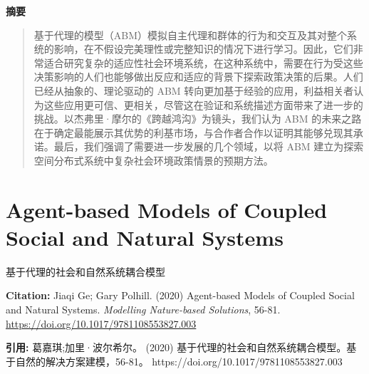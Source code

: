 \noindent\textbf{摘要}\par
\begin{quote}\small
基于代理的模型（ABM）模拟自主代理和群体的行为和交互及其对整个系统的影响，在不假设完美理性或完整知识的情况下进行学习。因此，它们非常适合研究复杂的适应性社会环境系统，在这种系统中，需要在行为受这些决策影响的人们也能够做出反应和适应的背景下探索政策决策的后果。人们已经从抽象的、理论驱动的 ABM 转向更加基于经验的应用，利益相关者认为这些应用更可信、更相关，尽管这在验证和系统描述方面带来了进一步的挑战。以杰弗里·摩尔的《跨越鸿沟》为镜头，我们认为 ABM 的未来之路在于确定最能展示其优势的利基市场，与合作者合作以证明其能够兑现其承诺。最后，我们强调了需要进一步发展的几个领域，以将 ABM 建立为探索空间分布式系统中复杂社会环境政策情景的预期方法。
\end{quote}

\vspace{0.5em}


\chapter{Agent-based Models of Coupled Social and Natural Systems}
\begin{center}\small 基于代理的社会和自然系统耦合模型\end{center}

\noindent\textbf{Citation:} Jiaqi Ge; Gary Polhill. (2020) Agent-based Models of Coupled Social and Natural Systems. \textit{Modelling Nature-based Solutions}, 56-81. \url{https://doi.org/10.1017/9781108553827.003}

\vspace{0.5em}
\noindent\textbf{引用:} 葛嘉琪;加里·波尔希尔。 (2020) 基于代理的社会和自然系统耦合模型。基于自然的解决方案建模，56-81。 https://doi.org/10.1017/9781108553827.003

